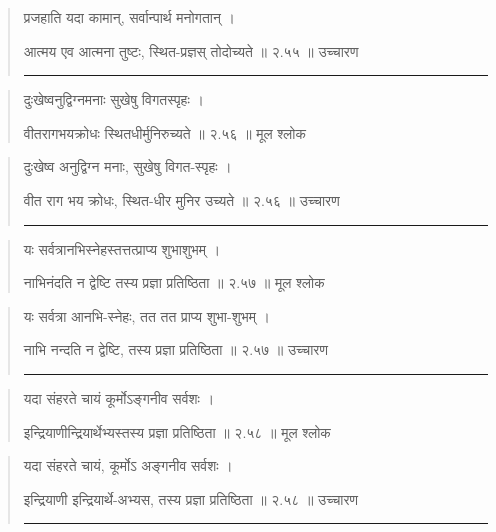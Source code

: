 \begin{quotation}

प्रजहाति यदा कामान्‌, सर्वान्पार्थ मनोगतान्‌  ।  

आत्मय एव आत्मना तुष्टः, स्थित-प्रज्ञस् तोदोच्यते  ॥ २.५५ ॥  उच्चारण

\noindent\rule{16cm}{0.4pt} 
\end{quotation}


\begin{quotation}

दुःखेष्वनुद्विग्नमनाः सुखेषु विगतस्पृहः  ।  

वीतरागभयक्रोधः स्थितधीर्मुनिरुच्यते  ॥ २.५६ ॥  मूल श्लोक
\end{quotation}

\begin{quotation}

दुःखेष्व अनुद्विग्न मनाः, सुखेषु विगत-स्पृहः  ।  

वीत राग भय क्रोधः, स्थित-धीर मुनिर उच्यते  ॥ २.५६ ॥  उच्चारण

\noindent\rule{16cm}{0.4pt} 
\end{quotation}


\begin{quotation}

यः सर्वत्रानभिस्नेहस्तत्तत्प्राप्य शुभाशुभम्‌  ।  

नाभिनंदति न द्वेष्टि तस्य प्रज्ञा प्रतिष्ठिता  ॥ २.५७ ॥  मूल श्लोक
\end{quotation}

\begin{quotation}
यः सर्वत्रा आनभि-स्नेहः, तत तत प्राप्य शुभा-शुभम्‌  ।  

नाभि नन्दति न द्वेष्टि, तस्य प्रज्ञा प्रतिष्ठिता  ॥ २.५७ ॥  उच्चारण

\noindent\rule{16cm}{0.4pt} 
\end{quotation}


\begin{quotation}
यदा संहरते चायं कूर्मोऽङ्गनीव सर्वशः  ।  

इन्द्रियाणीन्द्रियार्थेभ्यस्तस्य प्रज्ञा प्रतिष्ठिता  ॥ २.५८ ॥  मूल श्लोक
\end{quotation}

\begin{quotation}

यदा संहरते चायं, कूर्मोऽ अङ्गनीव सर्वशः  ।  

इन्द्रियाणी इन्द्रियार्थे-अभ्यस, तस्य प्रज्ञा प्रतिष्ठिता  ॥ २.५८ ॥  उच्चारण

\noindent\rule{16cm}{0.4pt} 
\end{quotation}


